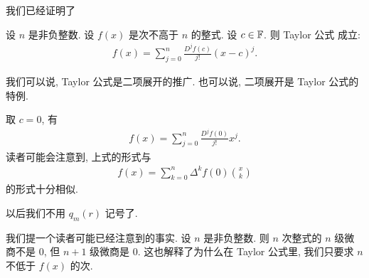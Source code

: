 我们已经证明了

\begin{proposition}
    设 $n$ 是非负整数. 设 $f(x)$ 是次不高于 $n$ 的整式. 设 $c \in \mathbb{F}$. 则 Taylor 公式  成立:
    \begin{align*}
        f(x) = \sum_{j = 0}^{n} \frac{D^j f(c)}{j!} (x-c)^j.
    \end{align*}
\end{proposition}

\begin{remark}
    我们可以说, Taylor 公式是二项展开的推广. 也可以说, 二项展开是 Taylor 公式的特例.
\end{remark}

\begin{remark}
    取 $c = 0$, 有
    \begin{align*}
        f(x) = \sum_{j = 0}^{n} \frac{D^j f(0)}{j!} x^j.
    \end{align*}
    读者可能会注意到, 上式的形式与
    \begin{align*}
        f(x) = \sum_{k = 0}^{n} \Delta^k f(0) \binom{x}{k}
    \end{align*}
    的形式十分相似.
\end{remark}

\begin{remark}
    以后我们不用 $q_m (r)$ 记号了.
\end{remark}

\begin{remark}
    我们提一个读者可能已经注意到的事实. 设 $n$ 是非负整数. 则 $n$ 次整式的 $n$ 级微商不是 $0$, 但 $n+1$ 级微商是 $0$. 这也解释了为什么在 Taylor 公式里, 我们只要求 $n$ 不低于 $f(x)$ 的次.
\end{remark}

